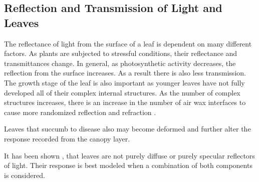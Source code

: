 \subsection{Reflection and Transmission of Light and Leaves}

The reflectance of light from the surface of a leaf is dependent on many different factors.  As plants are subjected to stressful conditions, their reflectance and transmittances change.  In general, as photosynthetic activity decreases, the reflection from the surface increases.  As a result there is also less transmission.  The growth stage of the leaf is also important as younger leaves have not fully developed all of their complex internal structures.  As the number of complex structures increases, there is an increase in the number of air wax interfaces to cause more randomized reflection and refraction \cite{photonvegetation}.

Leaves that succumb to disease also may become deformed and further alter the response recorded from the canopy layer.

It has been shown \cite{grant}, \cite{specularbrdf} that leaves are not purely diffuse or purely specular reflectors of light.  Their response is best modeled when a combination of both components is considered.
